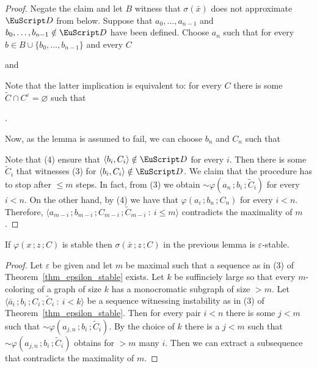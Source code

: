 \begin{proof}
  Negate the claim and let $B$ witness that $\sigma(\bar x)$ does not approximate ${\EuScript D}$ from below.
  Suppose that $a_0,\dots,a_{n-1}$ and $b_0,\dots,b_{n-1}\notin{\EuScript D}$ have been defined.
  Choose $a_n$ such that for every $b\in B\cup\{b_0,\dots,b_{n-1}\}$ and every $C$

  \quad and

  
  Note that the latter implication is equivalent to: for every $C$ there is some  $\tilde C\cap C^\varepsilon=\varnothing$ such that 
  
  .%

  Now, as the lemma is assumed to fail, we can choose $b_n$ and $C_n$ such that


  Note that (4) ensure that $\langle b_i,C_i\rangle\notin{\EuScript D}$ for every $i$.
  Then there is some $\tilde C_i$ that witnesses (3) for $\langle b_i,C_i\rangle\notin{\EuScript D}$.
  We claim that the procedure has to stop after $\le m$ steps. 
  In fact, from (3) we obtain ${\sim}\varphi(a_n\,;b_i\,;\tilde C_i)$ for every $i<n$.
  On the other hand, by (4) we have that $\varphi(a_i\,;b_n\,;C_n)$ for every $i<n$.
  Therefore, $\langle a_{m-i}\,;b_{m-i}\,;C_{m-i}\,;\tilde C_{m-i}\ :\ i\le m\rangle$ contradicts the maximality of $m$.
\end{proof}

\begin{lemma}
  If $\varphi(x\,;z\,;C)$ is stable then $\sigma(\bar x\,;z\,;C)$ in the previous lemma is $\varepsilon$-stable.
\end{lemma}

\begin{proof}
  Let $\varepsilon$ be given and let $m$ be maximal such that a sequence as in (3) of Theorem~\ref{thm_epsilon_stable} exists.
  Let $k$ be suffinciely large so that every $m$-coloring of a graph of size $k$ has a monocromatic subgraph of size $>m$.
  Let $\langle \bar a_i\,;b_i\,;C_i\,;\tilde C_i\ :\ i<k\rangle$ be a sequence witnessing instability as in (3) of Theorem~\ref{thm_epsilon_stable}.
  Then for every pair $i<n$ there is some $j<m$ such that ${\sim}\varphi(a_{j,n}\,;b_i\,;\tilde C_i)$.
  By the choice of $k$ there is a $j<m$ such that ${\sim}\varphi(a_{j,n}\,;b_i\,;\tilde C_i)$ obtains for $>m$ many $i$.
  Then we can extract a subsequence that contradicts the maximality of $m$.
\end{proof}

